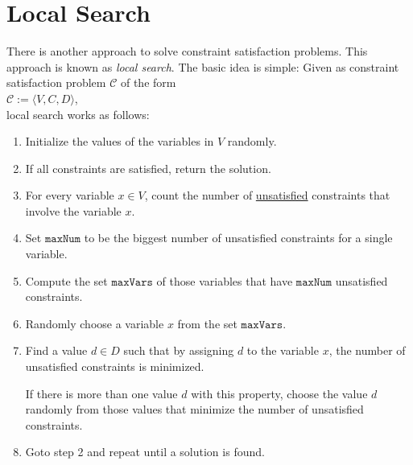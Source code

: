 \section{Local Search}
There is another approach to solve constraint satisfaction problems.  This approach is known as
\emph{\color{blue}local search}.  The basic idea is simple: Given as constraint satisfaction problem 
$\mathcal{C}$ of the form 
\\[0.2cm]
\hspace*{1.3cm}
$\mathcal{C} := \langle V, C, D \rangle$,
\\[0.2cm] 
local search works as follows:
\begin{enumerate}
\item Initialize the values of the variables in $V$ randomly.  
\item If all constraints are satisfied, return the solution.
\item For every variable $x \in V$, count the number of \underline{unsatisfied} constraints that involve the
      variable $x$. 
\item Set $\mathtt{maxNum}$ to be the biggest number of unsatisfied constraints for a single variable.
\item Compute the set $\mathtt{maxVars}$ of those variables that have $\mathtt{maxNum}$ unsatisfied constraints.
\item Randomly choose a variable $x$ from the set $\mathtt{maxVars}$.
\item Find a value $d \in D$ such that by assigning $d$ to the variable $x$, the number of unsatisfied constraints is
      minimized.  

      If there is more than one value $d$ with this property, choose the value $d$ randomly from those values
      that minimize the number of unsatisfied constraints.
\item Goto step 2 and repeat until a solution is found.
\end{enumerate}

